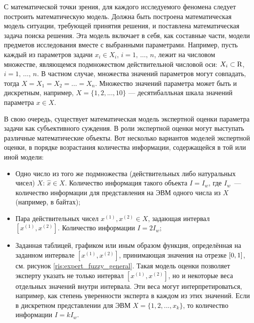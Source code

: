 С математической точки зрения, для каждого исследуемого феномена следует построить математическую модель. Должна быть построена математическая модель ситуации, требующей принятия решения, и поставлена математическая задача поиска решения. Эта модель включает в себя, как составные части, модели предметов исследования вместе с выбранными параметрами. Например, пусть каждый из параметров задачи $x_i \in X_i$,  $i=1,\, \ldots,\, n$, лежит на числовом множестве, являющемся подмножеством действительной числовой оси: $X_i \subset {\mathrm{R}}$, $i=1,\, \ldots,\, n$. В частном случае, множества значений параметров могут совпадать, тогда $X = X_1 = X_2 = \ldots = X_n$. Множество значений параметра может быть и дискретным, например, $X = \{1, 2, ..., 10\}$ --- десятибалльная шкала значений параметра $x \in X$.

В свою очередь, существует математическая модель экспертной оценки параметра задачи как субъективного суждения. В роли экспертной оценки могут выступать различные математические объекты. Вот несколько вариантов моделей экспертной оценки, в порядке возрастания количества информации, содержащейся в той или иной модели: 
\begin{itemize}
  \item Одно число из того же подмножества (действительных либо натуральных чисел) $X$: $\hat{x} \in X$. Количество информация такого объекта $I = I_w$, где $I_w$~--- количество информации для представления на ЭВМ одного числа из $X$ (например, в байтах);
  \item Пара действительных чисел $x^{(1)}, x^{(2)} \in X$, задающая интервал $[x^{(1)}, x^{(2)}]$. Количество информации $I = 2I_w$;
  \item Заданная таблицей, графиком или иным образом функция, определённая на заданном интервале $[x^{(1)}, x^{(2)}]$, принимающая значения на отрезке $[0,1]$, см. рисунок \ref{ris:expert_fuzzy_general}. Такая модель оценки позволяет эксперту указать не только интервал $[x^{(1)}, x^{(2)}]$, но и некоторые веса отдельных значений внутри интервала. Эти веса могут интерпретироваться, например, как степень уверенности эксперта в каждом из этих значений. Если в дискретном представлении для ЭВМ $X = \{1, 2, ..., x_{k}\}$, то количество информации $I = kI_w$. 
\end{itemize}

